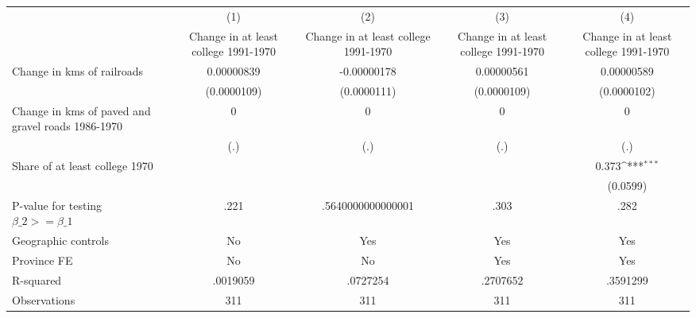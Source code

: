 {
\def\sym#1{\ifmmode^{#1}\else\(^{#1}\)\fi}
\begin{tabular}{l*{4}{c}}
\hline\hline
                &\multicolumn{1}{c}{(1)}&\multicolumn{1}{c}{(2)}&\multicolumn{1}{c}{(3)}&\multicolumn{1}{c}{(4)}\\
                &\multicolumn{1}{c}{Change in at least college 1991-1970}&\multicolumn{1}{c}{Change in at least college 1991-1970}&\multicolumn{1}{c}{Change in at least college 1991-1970}&\multicolumn{1}{c}{Change in at least college 1991-1970}\\
\hline
Change in kms of railroads&0.00000839         &-0.00000178         &0.00000561         &0.00000589         \\
                &(0.0000109)         &(0.0000111)         &(0.0000109)         &(0.0000102)         \\
[1em]
Change in kms of paved and gravel roads 1986-1970&        0         &        0         &        0         &        0         \\
                &      (.)         &      (.)         &      (.)         &      (.)         \\
[1em]
Share of at least college 1970&                  &                  &                  &    0.373\sym{***}\\
                &                  &                  &                  & (0.0599)         \\
\hline
P-value for testing $\beta\_{2} >= \beta\_{1}$&     .221         &.5640000000000001         &     .303         &     .282         \\
Geographic controls&       No         &      Yes         &      Yes         &      Yes         \\
Province FE     &       No         &       No         &      Yes         &      Yes         \\
R-squared       & .0019059         & .0727254         & .2707652         & .3591299         \\
Observations    &      311         &      311         &      311         &      311         \\
\hline\hline
\end{tabular}
}
